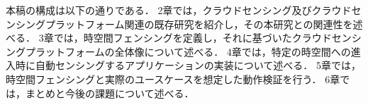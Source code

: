 本稿の構成は以下の通りである．
2章では，クラウドセンシング及びクラウドセンシングプラットフォーム関連の既存研究を紹介し，その本研究との関連性を述べる．
3章では，時空間フェンシングを定義し，それに基づいたクラウドセンシングプラットフォームの全体像について述べる．
4章では，特定の時空間への進入時に自動センシングするアプリケーションの実装について述べる．
5章では，時空間フェンシングと実際のユースケースを想定した動作検証を行う．
6章では，まとめと今後の課題について述べる．


